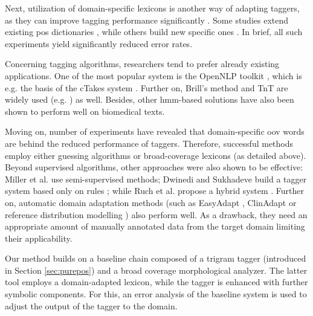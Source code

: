 Next, utilization of domain-specific lexicons is another way of adapting taggers, as they can improve tagging performance significantly \cite{coden2005domain,ruch2000minimal}. 
Some studies extend existing \acrshort{pos} dictionaries \cite{divita2006dtagger}, while others build new specific ones \cite{Smith2006}. 
In brief, all such experiments yield significantly reduced error rates. 

Concerning tagging algorithms, researchers tend to prefer already existing applications. 
One of the most popular system is the OpenNLP toolkit \cite{Baldridge2002}, which is e.g. the basis of the cTakes system \cite{Savova2010}.
Further on, Brill’s method \cite{Brill1992} and TnT \cite{Brants2000} are widely used (e.g. \cite{hahn2004tagging,Savova2010,pestian2004development}) as well. 
Besides, other \acrshort{hmm}-based solutions have also been shown to perform well \cite{barrett2011token,coden2005domain,divita2006dtagger,hahn2004tagging,pakhomov2006developing,rost2008lessons,ruch2000minimal} on biomedical texts. 

Moving on, number of experiments have revealed \cite{ferraro2013improving,ruch2000minimal,Smith2006} that domain-specific \acrshort{oov} words are behind the reduced performance of taggers. 
Therefore, successful methods employ either guessing algorithms \cite{barrett2011token,divita2006dtagger,rost2008lessons,ruch2000minimal,Smith2006} or broad-coverage lexicons (as detailed above). 
Beyond supervised algorithms, other approaches were also shown to be effective: Miller et al. \cite{miller2007building} use semi-supervised methods;
Dwinedi and Sukhadeve build a tagger system based only on rules \cite{dwivedi8rule}; while Ruch et al. propose a hybrid system \cite{ruch2000minimal}. 
Further on, automatic domain adaptation methods (such as EasyAdapt \cite{daume2007frustratingly}, ClinAdapt \cite{ferraro2013improving} 
or reference distribution modelling  \cite{tateisi2006subdomain}) also perform well. As a drawback, they need an appropriate amount of manually annotated data from the target domain limiting their applicability. 

Our method builds on a baseline chain composed of a trigram tagger (introduced in Section \ref{sec:purepos}) and a broad coverage morphological analyzer. 
The latter tool employs a domain-adapted lexicon, while the tagger is enhanced with further symbolic components.
For this, an error analysis of the baseline system is used to adjust the output of the tagger to the domain.

